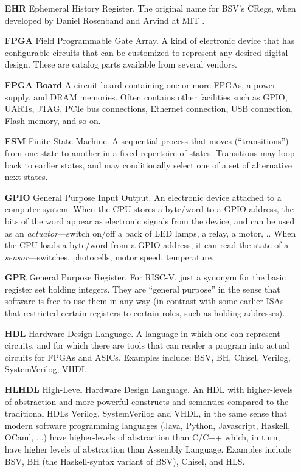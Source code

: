 \begin{itemize}
\item[\bf EHR] Ephemeral History Register.  The original name for
  BSV's CRegs, when developed by Daniel Rosenband and Arvind at MIT
  \cite{RosenbandMEMOCODE04, Rosenband2005b}.

\item[\bf FPGA] Field Programmable Gate Array.  A kind of electronic
  device that has configurable circuits that can be customized to
  represent any desired digital design.  These are catalog parts
  available from several vendors.

\item[\bf FPGA Board] A circuit board containing one or more FPGAs, a
  power supply, and DRAM memories.  Often contains other facilities
  such as GPIO, UARTs, JTAG, PCIe bus connections, Ethernet
  connection, USB connection, Flash memory, and so on.

\item[\bf FSM] Finite State Machine.  A sequential process that moves
  (``transitions'') from one state to another in a fixed repertoire of
  states.  Transitions may loop back to earlier states, and may
  conditionally select one of a set of alternative next-states.

\item[\bf GPIO] General Purpose Input Output.  An electronic device
  attached to a computer system. When the CPU stores a byte/word to a
  GPIO address, the bits of the word appear as electronic signals from
  the device, and can be used as an \emph{actuator}---switch on/off a
  back of LED lamps, a relay, a motor, {\etc.}.  When the CPU loads a
  byte/word from a GPIO address, it can read the state of a
  \emph{sensor}---switches, photocells, motor speed, temperature,
  {\etc.}

\item[\bf GPR] General Purpose Register.  For RISC-V, just a synonym
  for the basic register set holding integers.  They are ``general
  purpose'' in the sense that software is free to use them in any way
  (in contrast with some earlier ISAs that restricted certain
  registers to certain roles, such as holding addresses).

\item[\bf HDL] Hardware Design Language.  A language in which one can
  represent circuits, and for which there are tools that can render a
  program into actual circuits for FPGAs and ASICs.  Examples include:
  BSV, BH, Chisel, Verilog, SystemVerilog, VHDL.

\item[\bf HLHDL] High-Level Hardware Design Language.  An HDL with
  higher-levels of abstraction and more powerful constructs and
  semantics compared to the traditional HDLs Verilog, SystemVerilog
  and VHDL, in the same sense that modern software programming
  languages (Java, Python, Javascript, Haskell, OCaml, ...) have
  higher-levels of abstraction than C/C++ which, in turn, have higher
  levels of abstraction than Assembly Language.  Examples include BSV,
  BH (the Haskell-syntax variant of BSV), Chisel, and HLS.


\end{itemize}
